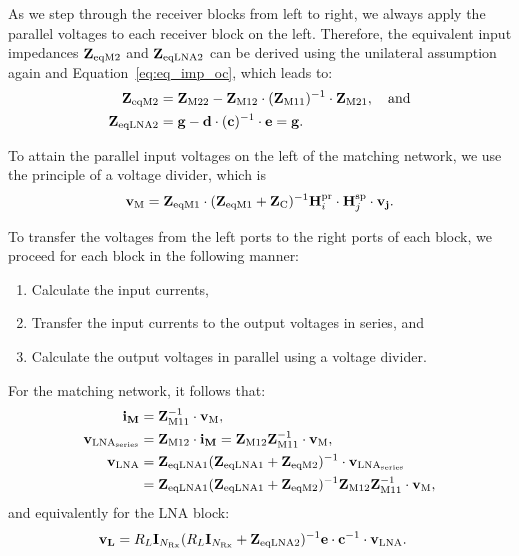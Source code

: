 As we step through the receiver blocks from left to right, we always apply the parallel voltages to each receiver block on the left.
Therefore, the equivalent input impedances $\mathbf{Z}_\text{eqM2}$ and $\mathbf{Z}_\text{eqLNA2}$ can be derived using the unilateral assumption again and Equation~\eqref{eq:eq_imp_oc}, which leads to:
\begin{align}
\label{eq:zeqm2}
\mathbf{Z}_\text{eqM2} &= \mathbf{Z}_\text{M22} - \mathbf{Z}_\text{M12}\cdot(\mathbf{Z}_\text{M11})^{-1}\cdot\mathbf{Z}_\text{M21},\quad\text{and}\\
\label{eq:zeqlna2}
\mathbf{Z}_\text{eqLNA2} &= \mathbf{g} - \mathbf{d}\cdot(\mathbf{c})^{-1}\cdot\mathbf{e} = \mathbf{g}.
\end{align}

To attain the parallel input voltages on the left of the matching network, we use the principle of a voltage divider, which is
\begin{equation}
\mathbf{v}_\text{M} = \mathbf{Z}_\text{eqM1}\cdot(\mathbf{Z}_\text{eqM1} + \mathbf{Z}_\text{C})^{-1} \mathbf{H}_i^{\text{pr}}\cdot\mathbf{H}_{j}^{\text{sp}}\cdot \mathbf{v_j}.
\end{equation}

To transfer the voltages from the left ports to the right ports of each block, we proceed for each block in the following manner: 
\begin{enumerate}
\item{Calculate the input currents,}
\item{Transfer the input currents to the output voltages in series, and}
\item{Calculate the output voltages in parallel using a voltage divider.}
\end{enumerate}
For the matching network, it follows that:
\begin{align}
\mathbf{i_M} &= \mathbf{Z}_\text{M11}^{-1}\cdot\mathbf{v}_\text{M},\\
\mathbf{v}_{\text{LNA}_\text{series}} &= \mathbf{Z}_\text{M12}\cdot\mathbf{i_M} = \mathbf{Z}_\text{M12} \mathbf{Z}_\text{M11}^{-1}\cdot\mathbf{v}_\text{M},\\
\mathbf{v}_\text{LNA} &= \mathbf{Z}_\text{eqLNA1}(\mathbf{Z}_\text{eqLNA1}+\mathbf{Z}_\text{eqM2})^{-1}\cdot\mathbf{v}_{\text{LNA}_\text{series}}\\\nonumber
&=\mathbf{Z}_\text{eqLNA1}(\mathbf{Z}_\text{eqLNA1}+\mathbf{Z}_\text{eqM2})^{-1}\mathbf{Z}_\text{M12} \mathbf{Z}_\text{M11}^{-1}\cdot\mathbf{v}_\text{M},
\end{align}
and equivalently for the LNA block:
\begin{align}
\mathbf{v_{L}}&=R_L\mathbf{I}_{N_\text{Rx}}(R_L\mathbf{I}_{N_\text{Rx}}+\mathbf{Z}_\text{eqLNA2})^{-1}\mathbf{e}\cdot\mathbf{c}^{-1}\cdot\mathbf{v}_\text{LNA}.
\end{align}

